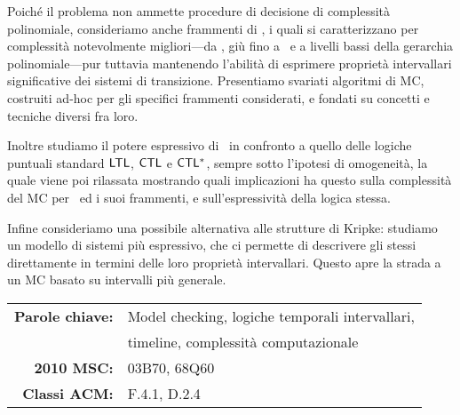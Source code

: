 Poiché il problema non ammette procedure di decisione di complessità polinomiale, 
consideriamo anche frammenti di \HS, i quali si caratterizzano per complessità notevolmente migliori---da
\EXPSPACE, giù fino a \Psp\ e a livelli bassi della gerarchia polinomiale---pur tuttavia mantenendo l'abilità di esprimere
proprietà intervallari significative dei sistemi di transizione. Presentiamo svariati algoritmi di MC, costruiti ad-hoc per gli specifici frammenti considerati, e fondati su concetti e tecniche diversi fra loro.

Inoltre studiamo il potere espressivo di \HS\ in confronto a quello delle logiche puntuali standard $\text{\sffamily LTL}$, $\text{\sffamily CTL}$ e $\text{\sffamily CTL$^{*}$}$, sempre sotto l'ipotesi di omogeneità, la quale viene poi rilassata mostrando quali implicazioni ha questo sulla complessità del MC per \HS\ ed i suoi frammenti, e sull'espressività della logica stessa.

Infine consideriamo una possibile alternativa alle strutture di Kripke: studiamo un modello di sistemi più espressivo, che ci permette di descrivere gli stessi direttamente in termini delle loro proprietà intervallari. Questo apre la strada a un MC basato su intervalli più generale.

\bigskip
\noindent\hrulefill
\bigskip

\begin{center}
\begin{tabular}{rl}
    \textbf{Parole chiave:} & Model checking, logiche temporali intervallari, \\
    & timeline, complessità computazionale \\ 
    \rule[-1ex]{0pt}{4.5ex} \textbf{2010 MSC:} & 03B70, 68Q60 \\ 
    \rule[-1ex]{0pt}{4.5ex} \textbf{Classi ACM:} & F.4.1, D.2.4 \\ 
\end{tabular}
\end{center}

